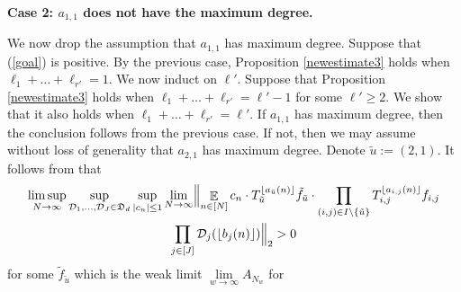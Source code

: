 \documentclass[11pt]{amsart}
\theoremstyle{definition}
\DeclareMathOperator*{\E}{\mathbb{E}}
\newcommand{\CD}{{\mathcal D}}
\newcommand{\FD}{{\mathfrak D}}
\newcommand{\veps}{\varepsilon}
\newcommand{\norm}[1]{\left\Vert #1\right\Vert}
\newcommand{\1}{{\mathbf{1}}}
\newcommand{\floor}[1]{{\left \lfloor #1 \right \rfloor}}
\begin{document}
\

\smallskip
\textbf{Case 2: $a_{1,1}$ does not have the maximum degree.}
\smallskip

We now drop the assumption that $a_{1,1}$ has maximum degree.
Suppose that (\ref{goal}) is positive. By the previous case, Proposition \ref{newestimate3} holds when $\ell_1+\dots+\ell_{r'}=1$. We now induct on $\ell'$. Suppose that Proposition \ref{newestimate3} holds when $\ell_1+\dots+\ell_{r'}=\ell'-1$ for some $\ell'\geq 2$. We show that it also holds when $\ell_1+\dots+\ell_{r'}=\ell'$. 
If $a_{1,1}$ has maximum degree, then the conclusion follows from the previous case. If not, then we may assume without loss of generality that $a_{2,1}$ has maximum degree. Denote $\tilde{u}:=(2,1)$.
   It follows from  \cite[Lemma 11.7]{DKKST24} that 
     \begin{multline*}
         \limsup_{N\to\infty}\sup_{\substack{
         \CD_1, \ldots, \CD_J \in \FD_d}} \sup_{|c_n|\leq 1}\lim_{N\to\infty}\Bigl\Vert\E_{n\in[N]}c_{n}\cdot T_{\tilde{u}}^{\floor{a_{\tilde{u}}(n)}}\tilde{f}_{\tilde{u}}\cdot\prod_{(i,j)\in I\backslash\{\tilde{u}\}}T_{i,j}^{\floor{a_{i,j}(n)}}f_{i,j}
         \\
         \prod_{j\in[J]}\mathcal{D}_{j}(\floor{b_{j}(n)})\Bigr\Vert_{2}>0
     \end{multline*}
     for some $\tilde{f}_{\tilde{u}}$ which is the weak limit $\lim\limits_{w\to\infty} A_{N_{w}}$ for 
\end{document}
